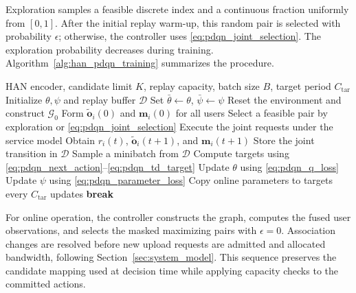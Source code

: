 \documentclass[journal]{IEEEtran}
\begin{document}
Exploration samples a feasible discrete index and a
continuous fraction uniformly from $[0,1]$.
After the initial replay warm-up, this random pair is
selected with probability $\epsilon$; otherwise, the
controller uses \eqref{eq:pdqn_joint_selection}.
The exploration probability decreases during training.
Algorithm~\ref{alg:han_pdqn_training} summarizes the procedure.

\begin{algorithm}[t]
\caption{HAN--PDQN Training}
\label{alg:han_pdqn_training}
\begin{algorithmic}[1]
\Require HAN encoder, candidate limit $K$, replay capacity,
batch size $B$, target period $C_{\mathrm{tar}}$
\State Initialize $\theta,\psi$ and replay buffer $\mathcal{D}$
\State Set $\bar{\theta}\gets\theta$, $\bar{\psi}\gets\psi$
    \State Reset the environment and construct $\mathcal{G}_0$
    \State Form $\widetilde{\mathbf{o}}_i(0)$ and
    $\mathbf{m}_i(0)$ for all users
            \State Select a feasible pair by exploration or
            \eqref{eq:pdqn_joint_selection}
        \EndFor
        \State Execute the joint requests under the service model
        \State Obtain $r_i(t)$, $\widetilde{\mathbf{o}}_i(t+1)$,
        and $\mathbf{m}_i(t+1)$
        \State Store the joint transition in $\mathcal{D}$
            \State Sample a minibatch from $\mathcal{D}$
            \State Compute targets using
            \eqref{eq:pdqn_next_action}--\eqref{eq:pdqn_td_target}
            \State Update $\theta$ using \eqref{eq:pdqn_q_loss}
            \State Update $\psi$ using \eqref{eq:pdqn_parameter_loss}
            \State Copy online parameters to targets every
            $C_{\mathrm{tar}}$ updates
        \EndIf
            \State \textbf{break}
        \EndIf
    \EndFor
\EndFor
\end{algorithmic}
\end{algorithm}

For online operation, the controller constructs the graph,
computes the fused user observations, and selects the
masked maximizing pairs with $\epsilon=0$.
Association changes are resolved before new upload
requests are admitted and allocated bandwidth, following
Section~\ref{sec:system_model}.
This sequence preserves the candidate mapping used
at decision time while applying capacity checks to
the committed actions.
\end{document}
